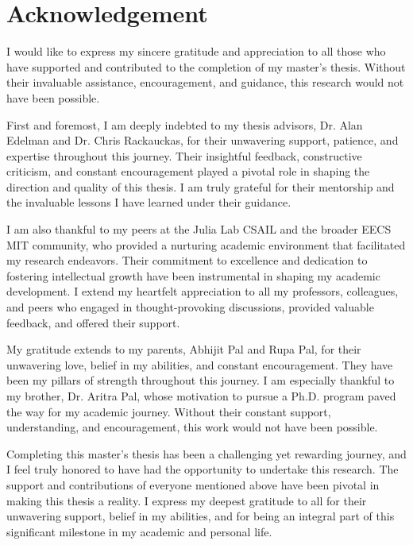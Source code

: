 \chapter*{Acknowledgement}

I would like to express my sincere gratitude and appreciation to all those who have supported and contributed to the completion of my master's thesis. Without their invaluable assistance, encouragement, and guidance, this research would not have been possible.

First and foremost, I am deeply indebted to my thesis advisors, Dr. Alan Edelman and Dr. Chris Rackauckas, for their unwavering support, patience, and expertise throughout this journey. Their insightful feedback, constructive criticism, and constant encouragement played a pivotal role in shaping the direction and quality of this thesis. I am truly grateful for their mentorship and the invaluable lessons I have learned under their guidance.

I am also thankful to my peers at the Julia Lab CSAIL and the broader EECS MIT community, who provided a nurturing academic environment that facilitated my research endeavors. Their commitment to excellence and dedication to fostering intellectual growth have been instrumental in shaping my academic development. I extend my heartfelt appreciation to all my professors, colleagues, and peers who engaged in thought-provoking discussions, provided valuable feedback, and offered their support.

My gratitude extends to my parents, Abhijit Pal and Rupa Pal, for their unwavering love, belief in my abilities, and constant encouragement. They have been my pillars of strength throughout this journey. I am especially thankful to my brother, Dr. Aritra Pal, whose motivation to pursue a Ph.D. program paved the way for my academic journey. Without their constant support, understanding, and encouragement, this work would not have been possible.

Completing this master's thesis has been a challenging yet rewarding journey, and I feel truly honored to have had the opportunity to undertake this research. The support and contributions of everyone mentioned above have been pivotal in making this thesis a reality. I express my deepest gratitude to all for their unwavering support, belief in my abilities, and for being an integral part of this significant milestone in my academic and personal life.